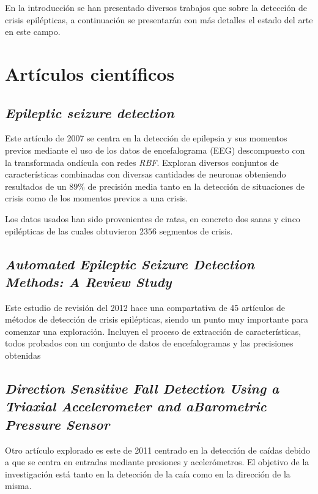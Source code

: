 
En la introducción se han presentado diversos trabajos que sobre la detección de crisis epilépticas, a continuación se presentarán con más detalles el estado del arte en este campo.

\section{Artículos científicos}
\subsection{\textbf{\textit{Epileptic seizure detection}}~\cite{schuyler2007epileptic}}
Este artículo de 2007 se centra en la detección de epilepsia y sus momentos previos mediante el uso de los datos de encefalograma (EEG) descompuesto con la transformada ondícula con redes \textit{RBF}. Exploran diversos conjuntos de características combinadas con diversas cantidades de neuronas obteniendo resultados de un $89\%$ de precisión media tanto en la detección de situaciones de crisis como de los momentos previos a una crisis.

Los datos usados han sido provenientes de ratas, en concreto dos sanas y cinco epilépticas de las cuales obtuvieron $2356$ segmentos de crisis.

\subsection{\textbf{\textit{Automated Epileptic Seizure Detection Methods: A Review Study}}~\cite{tzallas2012review}}
Este estudio de revisión del 2012 hace una compartativa de 45 artículos de métodos de detección de crisis epilépticas, siendo un punto muy importante para comenzar una exploración. Incluyen el proceso de extracción de características, todos probados con un conjunto de datos de encefalogramas y las precisiones obtenidas

\subsection{\textbf{\textit{Direction  Sensitive  Fall  Detection  Using  a  Triaxial  Accelerometer  and  aBarometric  Pressure  Sensor}}~\cite{tolkiehn2011fall}}
Otro artículo explorado es este de 2011 centrado en la detección de caídas debido a que se centra en entradas mediante presiones y acelerómetros. El objetivo de la investigación está tanto en la detección de la caía como en la dirección de la misma. 

